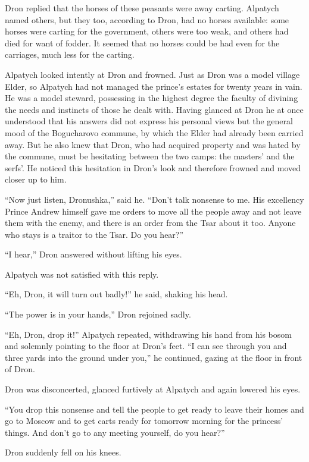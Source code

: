 Dron replied that the horses of these peasants were away carting.
Alpatych named others, but they too, according to Dron, had no
horses available: some horses were carting for the government,
others were too weak, and others had died for want of fodder. It
seemed that no horses could be had even for the carriages, much
less for the carting.

Alpatych looked intently at Dron and frowned. Just as Dron was a
model village Elder, so Alpatych had not managed the prince's
estates for twenty years in vain. He was a model steward,
possessing in the highest degree the faculty of divining the
needs and instincts of those he dealt with. Having glanced at
Dron he at once understood that his answers did not express his
personal views but the general mood of the Bogucharovo commune,
by which the Elder had already been carried away. But he also
knew that Dron, who had acquired property and was hated by the
commune, must be hesitating between the two camps: the masters'
and the serfs'.  He noticed this hesitation in Dron's look and
therefore frowned and moved closer up to him.

``Now just listen, Dronushka,'' said he. ``Don't talk nonsense to
me. His excellency Prince Andrew himself gave me orders to move
all the people away and not leave them with the enemy, and there
is an order from the Tsar about it too. Anyone who stays is a
traitor to the Tsar. Do you hear?''

``I hear,'' Dron answered without lifting his eyes.

Alpatych was not satisfied with this reply.

``Eh, Dron, it will turn out badly!'' he said, shaking his head.

``The power is in your hands,'' Dron rejoined sadly.

``Eh, Dron, drop it!'' Alpatych repeated, withdrawing his hand
from his bosom and solemnly pointing to the floor at Dron's
feet. ``I can see through you and three yards into the ground
under you,'' he continued, gazing at the floor in front of Dron.

Dron was disconcerted, glanced furtively at Alpatych and again
lowered his eyes.

``You drop this nonsense and tell the people to get ready to
leave their homes and go to Moscow and to get carts ready for
tomorrow morning for the princess' things. And don't go to any
meeting yourself, do you hear?''

Dron suddenly fell on his knees.

